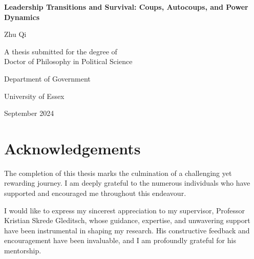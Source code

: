 \documentclass[
  12pt,
]{report}
\author{}
\date{}
\renewcommand*\contentsname{Table of contents}
\newcommand\contentsname{Table of contents}
\begin{document}
\begin{titlepage}
  \begin{center}
    \vspace*{2cm}
    
    \Huge{\textbf{Leadership Transitions and Survival: Coups, Autocoups, and Power Dynamics}}
    
    \vspace{1.5cm}
    
    \Large{Zhu Qi}
    
    \vspace{2cm}
    
    \large{A thesis submitted for the degree of \\ Doctor of Philosophy in Political Science}
    
    \vspace{7cm}
    
    \large{Department of Government}
    \vspace{0.5cm}
    
    \large{University of Essex}
    
    \vspace{1.5cm}
    
    \large{September 2024}
    \vspace{2cm}
    
    
  \end{center}
\end{titlepage}

\renewcommand*\contentsname{Contents}
{
\hypersetup{linkcolor=}
\setcounter{tocdepth}{2}
\tableofcontents
}
\listoffigures
\listoftables

\chapter*{Acknowledgements}\label{acknowledgements}

The completion of this thesis marks the culmination of a challenging yet
rewarding journey. I am deeply grateful to the numerous individuals who
have supported and encouraged me throughout this endeavour.

I would like to express my sincerest appreciation to my supervisor,
Professor Kristian Skrede Gleditsch, whose guidance, expertise, and
unwavering support have been instrumental in shaping my research. His
constructive feedback and encouragement have been invaluable, and I am
profoundly grateful for his mentorship.
\end{document}
